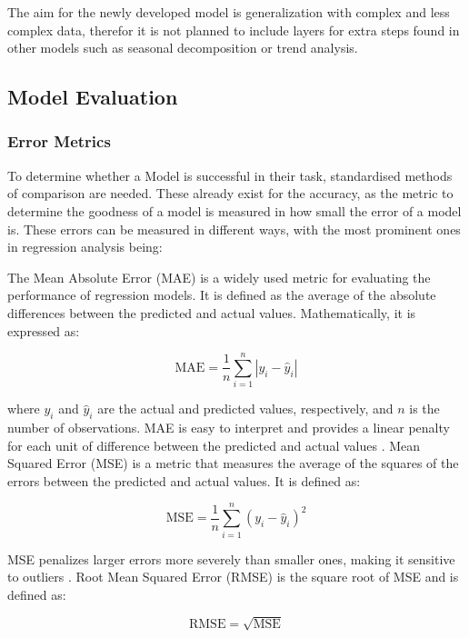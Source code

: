 \documentclass{article}
\begin{document}
The aim for the newly developed model is generalization with complex and less complex data, therefor it is not planned to include layers for extra steps found in other models such as seasonal decomposition or trend analysis.

\subsection{Model Evaluation}
\subsubsection{Error Metrics}

To determine whether a Model is successful in their task, standardised methods of comparison are needed. These already exist for the accuracy, as the metric to determine the goodness of a model is measured in how small the error of a model is. These errors can be measured in different ways, with the most prominent ones in regression analysis being:

The Mean Absolute Error (MAE) is a widely used metric for evaluating the performance of regression models. It is defined as the average of the absolute differences between the predicted and actual values. Mathematically, it is expressed as:

\begin{equation}\label{eq:MAE}
\text{MAE} = \frac{1}{n} \sum_{i=1}^{n} \left| y_i - \hat{y}_i \right|
\end{equation}

where \(y_i\) and \(\hat{y}_i\) are the actual and predicted values, respectively, and \(n\) is the number of observations. MAE is easy to interpret and provides a linear penalty for each unit of difference between the predicted and actual values \cite{MAE_RMSE}.
Mean Squared Error (MSE) is a metric that measures the average of the squares of the errors between the predicted and actual values. It is defined as:

\begin{equation}\label{eq:MSE}
\text{MSE} = \frac{1}{n} \sum_{i=1}^{n} (y_i - \hat{y}_i)^2
\end{equation}

MSE penalizes larger errors more severely than smaller ones, making it sensitive to outliers \cite{MSE}.
Root Mean Squared Error (RMSE) is the square root of MSE and is defined as:

\begin{equation}\label{eq:RMSE}
\text{RMSE} = \sqrt{\text{MSE}}
\end{equation}
\end{document}
